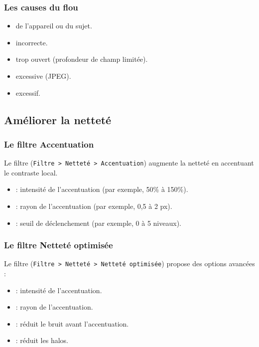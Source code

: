 \subsubsection{Les causes du flou}

\begin{itemize}
    \item {} de l'appareil ou du sujet.
    \item {} incorrecte.
    \item {} trop ouvert (profondeur de champ limitée).
    \item {} excessive (JPEG).
    \item {} excessif.
\end{itemize}

\subsection{Améliorer la netteté}

\subsubsection{Le filtre Accentuation}

Le filtre  (\texttt{Filtre > Netteté > Accentuation}) augmente la netteté en accentuant le contraste local.

\begin{itemize}
    \item {} : intensité de l'accentuation (par exemple, 50\% à 150\%).
    \item {} : rayon de l'accentuation (par exemple, 0,5 à 2 px).
    \item {} : seuil de déclenchement (par exemple, 0 à 5 niveaux).
\end{itemize}

\subsubsection{Le filtre Netteté optimisée}

Le filtre  (\texttt{Filtre > Netteté > Netteté optimisée}) propose des options avancées :

\begin{itemize}
    \item {} : intensité de l'accentuation.
    \item {} : rayon de l'accentuation.
    \item {} : réduit le bruit avant l'accentuation.
    \item {} : réduit les halos.
\end{itemize}

